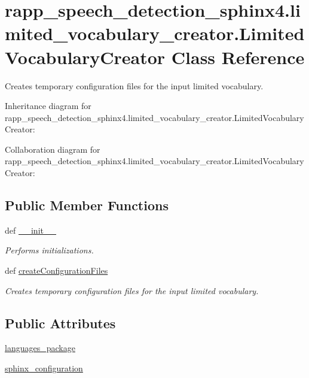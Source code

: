 \hypertarget{classrapp__speech__detection__sphinx4_1_1limited__vocabulary__creator_1_1LimitedVocabularyCreator}{\section{rapp\-\_\-speech\-\_\-detection\-\_\-sphinx4.\-limited\-\_\-vocabulary\-\_\-creator.\-Limited\-Vocabulary\-Creator Class Reference}
\label{classrapp__speech__detection__sphinx4_1_1limited__vocabulary__creator_1_1LimitedVocabularyCreator}
}


Creates temporary configuration files for the input limited vocabulary.  




Inheritance diagram for rapp\-\_\-speech\-\_\-detection\-\_\-sphinx4.\-limited\-\_\-vocabulary\-\_\-creator.\-Limited\-Vocabulary\-Creator\-:


Collaboration diagram for rapp\-\_\-speech\-\_\-detection\-\_\-sphinx4.\-limited\-\_\-vocabulary\-\_\-creator.\-Limited\-Vocabulary\-Creator\-:
\subsection*{Public Member Functions}
\begin{DoxyCompactItemize}
\item 
def \hyperlink{classrapp__speech__detection__sphinx4_1_1limited__vocabulary__creator_1_1LimitedVocabularyCreator_a26ef90561284a9d51a29894801fbdbd8}{\-\_\-\-\_\-init\-\_\-\-\_\-}
\begin{DoxyCompactList}\small\item\em Performs initializations. \end{DoxyCompactList}\item 
def \hyperlink{classrapp__speech__detection__sphinx4_1_1limited__vocabulary__creator_1_1LimitedVocabularyCreator_a5ea9589816e726aca357489c2e7a1d19}{create\-Configuration\-Files}
\begin{DoxyCompactList}\small\item\em Creates temporary configuration files for the input limited vocabulary. \end{DoxyCompactList}\end{DoxyCompactItemize}
\subsection*{Public Attributes}
\begin{DoxyCompactItemize}
\item 
\hyperlink{classrapp__speech__detection__sphinx4_1_1limited__vocabulary__creator_1_1LimitedVocabularyCreator_a10de167164331a6e41fede2863f69ab0}{languages\-\_\-package}
\item 
\hyperlink{classrapp__speech__detection__sphinx4_1_1limited__vocabulary__creator_1_1LimitedVocabularyCreator_a7ddf95a2e0ec8488cf1677f8d68e0846}{sphinx\-\_\-configuration}
\end{DoxyCompactItemize}
